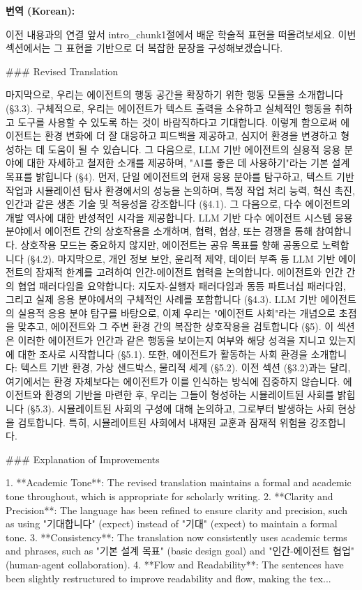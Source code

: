 \documentclass[12pt,a4paper]{article}
\begin{document}
\begin{mdframed}[style=ko]
\noindent\textbf{\small 번역 (Korean):}\\[2pt]
\begin{linkbox}{이전 내용과의 연결}
  앞서 intro_chunk1절에서 배운 학술적 표현을 떠올려보세요. 이번 섹션에서는 그 표현을 기반으로 더 복잡한 문장을 구성해보겠습니다.
\end{linkbox}
### Revised Translation

마지막으로, 우리는 에이전트의 행동 공간을 확장하기 위한 행동 모듈을 소개합니다 (§3.3). 구체적으로, 우리는 에이전트가 텍스트 출력을 소유하고 실체적인 행동을 취하고 도구를 사용할 수 있도록 하는 것이 바람직하다고 기대합니다. 이렇게 함으로써 에이전트는 환경 변화에 더 잘 대응하고 피드백을 제공하고, 심지어 환경을 변경하고 형성하는 데 도움이 될 수 있습니다. 그 다음으로, LLM 기반 에이전트의 실용적 응용 분야에 대한 자세하고 철저한 소개를 제공하며, "AI를 좋은 데 사용하기"라는 기본 설계 목표를 밝힙니다 (§4). 먼저, 단일 에이전트의 현재 응용 분야를 탐구하고, 텍스트 기반 작업과 시뮬레이션 탐사 환경에서의 성능을 논의하며, 특정 작업 처리 능력, 혁신 촉진, 인간과 같은 생존 기술 및 적응성을 강조합니다 (§4.1). 그 다음으로, 다수 에이전트의 개발 역사에 대한 반성적인 시각을 제공합니다. LLM 기반 다수 에이전트 시스템 응용 분야에서 에이전트 간의 상호작용을 소개하며, 협력, 협상, 또는 경쟁을 통해 참여합니다. 상호작용 모드는 중요하지 않지만, 에이전트는 공유 목표를 향해 공동으로 노력합니다 (§4.2). 마지막으로, 개인 정보 보안, 윤리적 제약, 데이터 부족 등 LLM 기반 에이전트의 잠재적 한계를 고려하여 인간-에이전트 협력을 논의합니다. 에이전트와 인간 간의 협업 패러다임을 요약합니다: 지도자-실행자 패러다임과 동등 파트너십 패러다임, 그리고 실제 응용 분야에서의 구체적인 사례를 포함합니다 (§4.3). LLM 기반 에이전트의 실용적 응용 분야 탐구를 바탕으로, 이제 우리는 "에이전트 사회"라는 개념으로 초점을 맞추고, 에이전트와 그 주변 환경 간의 복잡한 상호작용을 검토합니다 (§5). 이 섹션은 이러한 에이전트가 인간과 같은 행동을 보이는지 여부와 해당 성격을 지니고 있는지에 대한 조사로 시작합니다 (§5.1). 또한, 에이전트가 활동하는 사회 환경을 소개합니다: 텍스트 기반 환경, 가상 샌드박스, 물리적 세계 (§5.2). 이전 섹션 (§3.2)과는 달리, 여기에서는 환경 자체보다는 에이전트가 이를 인식하는 방식에 집중하지 않습니다. 에이전트와 환경의 기반을 마련한 후, 우리는 그들이 형성하는 시뮬레이트된 사회를 밝힙니다 (§5.3). 시뮬레이트된 사회의 구성에 대해 논의하고, 그로부터 발생하는 사회 현상을 검토합니다. 특히, 시뮬레이트된 사회에서 내재된 교훈과 잠재적 위험을 강조합니다.

### Explanation of Improvements

1. **Academic Tone**: The revised translation maintains a formal and academic tone throughout, which is appropriate for scholarly writing.
2. **Clarity and Precision**: The language has been refined to ensure clarity and precision, such as using "기대합니다" (expect) instead of "기대" (expect) to maintain a formal tone.
3. **Consistency**: The translation now consistently uses academic terms and phrases, such as "기본 설계 목표" (basic design goal) and "인간-에이전트 협업" (human-agent collaboration).
4. **Flow and Readability**: The sentences have been slightly restructured to improve readability and flow, making the tex...
\end{mdframed}
\end{document}
